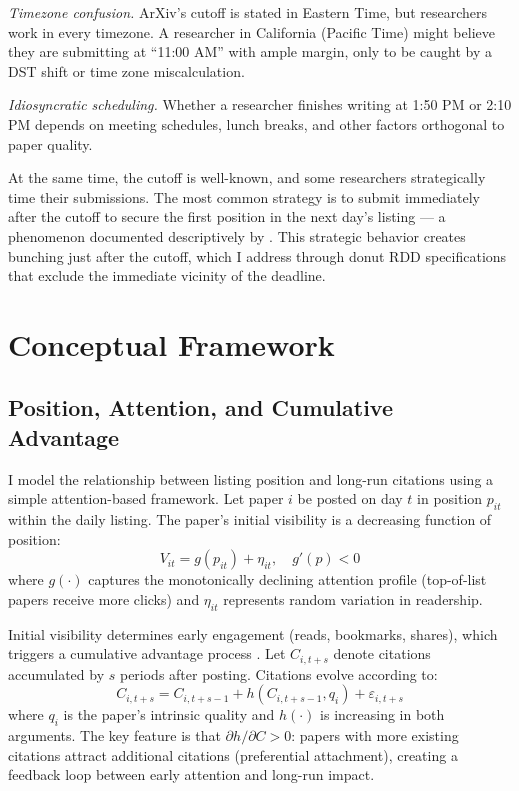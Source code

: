 \documentclass[12pt]{article}
\begin{document}
\textit{Timezone confusion.} ArXiv's cutoff is stated in Eastern Time, but researchers work in every timezone. A researcher in California (Pacific Time) might believe they are submitting at ``11:00 AM'' with ample margin, only to be caught by a DST shift or time zone miscalculation.

\textit{Idiosyncratic scheduling.} Whether a researcher finishes writing at 1:50 PM or 2:10 PM depends on meeting schedules, lunch breaks, and other factors orthogonal to paper quality.

At the same time, the cutoff is well-known, and some researchers strategically time their submissions. The most common strategy is to submit immediately after the cutoff to secure the first position in the next day's listing --- a phenomenon documented descriptively by \citet{haque2009}. This strategic behavior creates bunching just after the cutoff, which I address through donut RDD specifications that exclude the immediate vicinity of the deadline.


\section{Conceptual Framework}

\subsection{Position, Attention, and Cumulative Advantage}

I model the relationship between listing position and long-run citations using a simple attention-based framework. Let paper $i$ be posted on day $t$ in position $p_{it}$ within the daily listing. The paper's initial visibility is a decreasing function of position:
\begin{equation}
V_{it} = g(p_{it}) + \eta_{it}, \quad g'(p) < 0
\end{equation}
where $g(\cdot)$ captures the monotonically declining attention profile (top-of-list papers receive more clicks) and $\eta_{it}$ represents random variation in readership.

Initial visibility determines early engagement (reads, bookmarks, shares), which triggers a cumulative advantage process \citep{merton1968, barabasi1999}. Let $C_{i,t+s}$ denote citations accumulated by $s$ periods after posting. Citations evolve according to:
\begin{equation}
C_{i,t+s} = C_{i,t+s-1} + h(C_{i,t+s-1}, q_i) + \varepsilon_{i,t+s}
\end{equation}
where $q_i$ is the paper's intrinsic quality and $h(\cdot)$ is increasing in both arguments. The key feature is that $\partial h / \partial C > 0$: papers with more existing citations attract additional citations (preferential attachment), creating a feedback loop between early attention and long-run impact.
\end{document}

